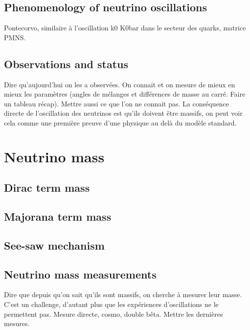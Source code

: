 \documentclass[main.tex]{subfiles}
\begin{document}
\subsection{Phenomenology of neutrino oscillations}
\NI Pontecorvo, similaire à l'oscillation k0 K0bar dans le secteur des quarks, matrice PMNS.

\subsection{Observations and status}
\NI Dire qu'aujourd'hui on les a observées. On connait et on mesure de mieux en mieux les paramètres (angles de mélanges et différences de masse au carré. Faire un tableau récap). Mettre aussi ce que l'on ne connait pas. La conséquence directe de l'oscillation des neutrinos est qu'ils doivent \^etre massifs, on peut voir cela comme une première preuve d'une physique au delà du modèle standard. 


\section{Neutrino mass}
\subsection{Dirac term mass}
\subsection{Majorana term mass}
\subsection{See-saw mechanism}
\subsection{Neutrino mass measurements}
\NI Dire que depuis qu'on sait qu'ils sont massifs, on cherche à mesurer leur masse. C'est un challenge, d'autant plus que les expériences d'oscillations ne le permettent pas. Mesure directe, cosmo, double b\^eta. Mettre les dernières mesures.
\end{document}
